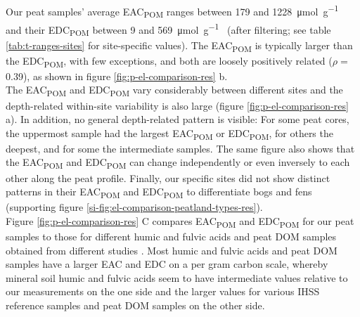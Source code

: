 \documentclass[draft,linenumbers]{agujournal2018}
\begin{document}
Our peat samples' average EAC\textsubscript{POM} ranges between 179 and
\SI{1228}{\micro\mol\per\g\carbon} and their EDC\textsubscript{POM}
between 9 and \SI{569}{\micro\mol\per\g\carbon} (after filtering; see
table \ref{tab:t-ranges-sites} for site-specific values). The
EAC\textsubscript{POM} is typically larger than the
EDC\textsubscript{POM}, with few exceptions, and both are loosely
positively related (\(\rho=\) 0.39), as shown in figure
\ref{fig:p-el-comparison-res} b.\\
The EAC\textsubscript{POM} and EDC\textsubscript{POM} vary considerably
between different sites and the depth-related within-site variability is
also large (figure \ref{fig:p-el-comparison-res} a). In addition, no
general depth-related pattern is visible: For some peat cores, the
uppermost sample had the largest EAC\textsubscript{POM} or
EDC\textsubscript{POM}, for others the deepest, and for some the
intermediate samples. The same figure also shows that the
EAC\textsubscript{POM} and EDC\textsubscript{POM} can change
independently or even inversely to each other along the peat profile.
Finally, our specific sites did not show distinct patterns in their
EAC\textsubscript{POM} and EDC\textsubscript{POM} to differentiate bogs
and fens (supporting figure
\ref{si-fig:el-comparison-peatland-types-res}).\\
Figure \ref{fig:p-el-comparison-res} C compares EAC\textsubscript{POM}
and EDC\textsubscript{POM} for our peat samples to those for different
humic and fulvic acids and peat DOM samples obtained from different
studies \citep{Aeschbacher.2012, Tan.2017, Walpen.2018}. Most humic and
fulvic acids and peat DOM samples have a larger EAC and EDC on a per
gram carbon scale, whereby mineral soil humic and fulvic acids
\citep{Tan.2017} seem to have intermediate values relative to our
measurements on the one side and the larger values for various IHSS
reference samples \citep{Aeschbacher.2012} and peat DOM samples
\citep{Walpen.2018} on the other side.
\end{document}

